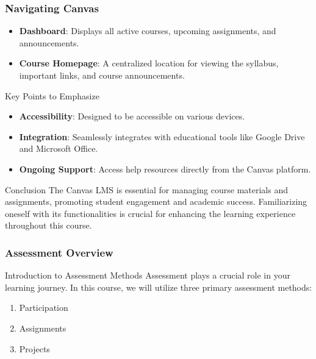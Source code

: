\documentclass[aspectratio=169]{beamer}
\begin{document}
\begin{frame}[fragile]
    \frametitle{Navigating Canvas}
    \begin{itemize}
        \item \textbf{Dashboard}: Displays all active courses, upcoming assignments, and announcements.
        \item \textbf{Course Homepage}: A centralized location for viewing the syllabus, important links, and course announcements.
    \end{itemize}

    \begin{block}{Key Points to Emphasize}
        \begin{itemize}
            \item \textbf{Accessibility}: Designed to be accessible on various devices.
            \item \textbf{Integration}: Seamlessly integrates with educational tools like Google Drive and Microsoft Office.
            \item \textbf{Ongoing Support}: Access help resources directly from the Canvas platform.
        \end{itemize}
    \end{block}

    \begin{block}{Conclusion}
        The Canvas LMS is essential for managing course materials and assignments, promoting student engagement and academic success. Familiarizing oneself with its functionalities is crucial for enhancing the learning experience throughout this course.
    \end{block}
\end{frame}

\begin{frame}[fragile]
    \frametitle{Assessment Overview}
    \begin{block}{Introduction to Assessment Methods}
        Assessment plays a crucial role in your learning journey. In this course, we will utilize three primary assessment methods:
        \begin{enumerate}
            \item Participation
            \item Assignments
            \item Projects
        \end{enumerate}
    \end{block}
\end{frame}
\end{document}
